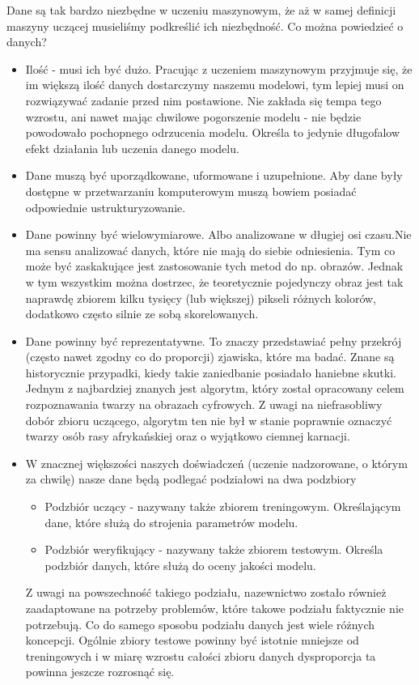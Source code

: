 \documentclass[10pt,a4paper]{book}
\begin{document}
Dane są tak bardzo niezbędne w uczeniu maszynowym, że aż w samej definicji maszyny uczącej musieliśmy podkreślić ich niezbędność. Co można powiedzieć o danych?
\begin{itemize}
\item Ilość - musi ich być dużo. Pracując z uczeniem maszynowym przyjmuje się, że im większą ilość danych dostarczymy naszemu modelowi, tym lepiej musi on rozwiązywać zadanie przed nim postawione. Nie zakłada się tempa tego wzrostu, ani nawet mając chwilowe pogorszenie modelu - nie będzie powodowało pochopnego odrzucenia modelu. Określa to jedynie długofalow efekt działania lub uczenia danego modelu.
\item Dane muszą być uporządkowane, uformowane i uzupełnione. Aby dane były dostępne w przetwarzaniu komputerowym muszą bowiem posiadać odpowiednie ustrukturyzowanie.
\item Dane powinny być wielowymiarowe. Albo analizowane w długiej osi czasu.Nie ma sensu analizować danych, które nie mają do siebie odniesienia. Tym co może być zaskakujące jest zastosowanie tych metod do np. obrazów. Jednak w tym wszystkim można dostrzec, że teoretycznie pojedynczy obraz jest tak naprawdę zbiorem kilku tysięcy (lub większej) pikseli różnych kolorów, dodatkowo często silnie ze sobą skorelowanych.  
\item Dane powinny być reprezentatywne. To znaczy przedstawiać pełny przekrój (często nawet zgodny co do proporcji) zjawiska, które ma badać. Znane są historycznie przypadki, kiedy takie zaniedbanie posiadało haniebne skutki. Jednym z najbardziej znanych jest algorytm, który został opracowany celem rozpoznawania twarzy na obrazach cyfrowych. Z uwagi na niefrasobliwy dobór zbioru uczącego, algorytm ten nie był w stanie poprawnie oznaczyć twarzy osób rasy afrykańskiej oraz o wyjątkowo ciemnej karnacji. 
\item W znacznej większości naszych doświadczeń (uczenie nadzorowane, o którym za chwilę) nasze dane będą podlegać podziałowi na dwa podzbiory
\begin{itemize}
\item Podzbiór uczący - nazywany także zbiorem treningowym. Określającym dane, które służą do strojenia parametrów modelu. 
\item Podzbiór weryfikujący - nazywany także zbiorem testowym. Określa podzbiór danych, które służą do oceny jakości modelu.
\end{itemize}
Z uwagi na powszechność takiego podziału, nazewnictwo zostało również zaadaptowane na potrzeby problemów, które takowe podziału faktycznie nie potrzebują. Co do samego sposobu podziału danych jest wiele różnych koncepcji. Ogólnie zbiory testowe powinny być istotnie mniejsze od treningowych i w miarę wzrostu całości zbioru danych dysproporcja ta powinna jeszcze rozrosnąć się. 
\end{itemize}
\end{document}

